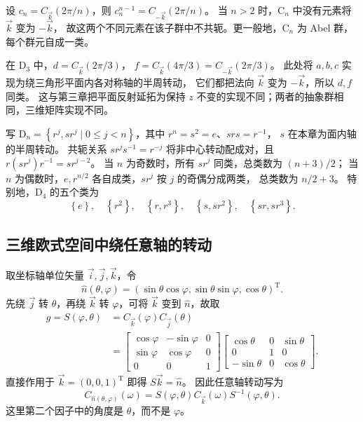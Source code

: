 \begin{example}[循环群与二面体群]
设 $c_n=C_{\vec k}\left(2\pi/n\right)$，则
$c_n^{n-1}=C_{-\vec k}\left(2\pi/n\right)$。
当 $n>2$ 时，$\mathrm{C}_n$ 中没有元素将 $\vec k$ 变为 $-\vec k$，
故这两个不同元素在该子群中不共轭。更一般地，$\mathrm{C}_n$ 为 Abel 群，每个群元自成一类。

在 $\mathrm{D}_3$ 中，$d=C_{\vec k}\left(2\pi/3\right)$，
$f=C_{\vec k}\left(4\pi/3\right)=C_{-\vec k}\left(2\pi/3\right)$。
此处将 $a,b,c$ 实现为绕三角形平面内各对称轴的半周转动，
它们都把法向 $\vec k$ 变为 $-\vec k$，所以 $d,f$ 同类。
这与第三章把平面反射延拓为保持 $z$ 不变的实现不同；两者的抽象群相同，三维矩阵实现不同。
\end{example}

\begin{remark}
写 $\mathrm{D}_n=\left\{r^j,sr^j\mid0\leqslant j<n\right\}$，其中 $r^n=s^2=e$、$srs=r^{-1}$，
$s$ 在本章为面内轴的半周转动。
共轭关系 $sr^js^{-1}=r^{-j}$ 将非中心转动配成对，且
$r\left(sr^j\right)r^{-1}=sr^{j-2}$。
当 $n$ 为奇数时，所有 $sr^j$ 同类，总类数为 $\left(n+3\right)/2$；
当 $n$ 为偶数时，$e,r^{n/2}$ 各自成类，$sr^j$ 按 $j$ 的奇偶分成两类，
总类数为 $n/2+3$。
特别地，$\mathrm{D}_4$ 的五个类为
\begin{equation}
\left\{e\right\},\quad\left\{r^2\right\},\quad\left\{r,r^3\right\},\quad\left\{s,sr^2\right\},\quad\left\{sr,sr^3\right\}.
\end{equation}
\end{remark}

\subsection{三维欧式空间中绕任意轴的转动}
取坐标轴单位矢量 $\vec i,\vec j,\vec k$，令
\begin{equation}
\hat n\left(\theta,\varphi\right)=\left(\sin\theta\cos\varphi,\sin\theta\sin\varphi,\cos\theta\right)^{\mathrm{T}}.
\end{equation}
先绕 $\vec j$ 转 $\theta$，再绕 $\vec k$ 转 $\varphi$，可将 $\vec k$ 变到 $\hat n$，故取
\begin{align}
g=S\left(\varphi,\theta\right)&=C_{\vec k}\left(\varphi\right)C_{\vec j}\left(\theta\right)\\
&=\begin{bmatrix}\cos\varphi&-\sin\varphi&0\\\sin\varphi&\cos\varphi&0\\0&0&1\end{bmatrix}
\begin{bmatrix}\cos\theta&0&\sin\theta\\0&1&0\\-\sin\theta&0&\cos\theta\end{bmatrix}.
\end{align}
直接作用于 $\vec k=\left(0,0,1\right)^{\mathrm{T}}$ 即得 $S\vec k=\hat n$。
因此任意轴转动写为
\begin{equation}
C_{\hat n\left(\theta,\varphi\right)}\left(\omega\right)
=S\left(\varphi,\theta\right)C_{\vec k}\left(\omega\right)S^{-1}\left(\varphi,\theta\right).
\end{equation}
这里第二个因子中的角度是 $\theta$，而不是 $\varphi$。

